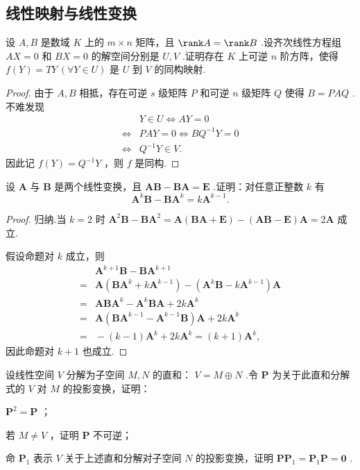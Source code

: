 \subsection{线性映射与线性变换}
\begin{prob}[2]
	设 $A,B$ 是数域 $K$ 上的 $m\times n$ 矩阵，且 $\rank A=\rank B$ .设齐次线性方程组 $AX=0$ 和 $BX=0$ 的解空间分别是 $U,V$ .证明存在 $K$ 上可逆 $n$ 阶方阵，使得 $f(Y)=TY\,(\forall Y\in U)$ 是 $U$ 到 $V$ 的同构映射.
\end{prob}
\begin{proof}
	由于 $A,B$ 相抵，存在可逆 $s$ 级矩阵 $P$ 和可逆 $n$ 级矩阵 $Q$ 使得 $B=PAQ$ .不难发现
	\begin{align*}
		     & {}Y\in U\iff AY=0      \\
		\iff & {}PAY=0\iff BQ^{-1}Y=0 \\
		\iff & {}Q^{-1}Y\in V.
	\end{align*}
	因此记 $f(Y)=Q^{-1}Y$ ，则 $f$ 是同构.
\end{proof}
\begin{prob}[14]
	设 $\bm A$ 与 $\bm B$ 是两个线性变换，且 $\bm{AB}-\bm{BA}=\bm E$ .证明：对任意正整数 $k$ 有
	\[
		\bm A^k\bm B-\bm B\bm A^k=k\bm A^{k-1}.
	\]
\end{prob}
\begin{proof}
	归纳.当 $k=2$ 时 $\bm A^2\bm B-\bm B\bm A^2=\bm A(\bm{BA}+\bm E)-(\bm{AB}-\bm E)\bm A=2\bm A$ 成立.

	假设命题对 $k$ 成立，则
	\begin{align*}
		  & {}\bm A^{k+1}\bm B-\bm B\bm A^{k+1}                              \\
		= & {}\bm A(\bm{BA}^k+k\bm A^{k-1})-(\bm A^k\bm B-k\bm A^{k-1})\bm A \\
		= & {}\bm{ABA}^k-\bm A^k\bm{BA}+2k\bm A^k                            \\
		= & {}\bm A(\bm{BA}^{k-1}-\bm A^{k-1}\bm B)\bm A+2k\bm A^k           \\
		= & {}-(k-1)\bm A^k+2k\bm A^k=(k+1)\bm A^k,
	\end{align*}
	因此命题对 $k+1$ 也成立.
\end{proof}
\begin{prob}[15]
	设线性空间 $V$ 分解为子空间 $M,N$ 的直和： $V=M\oplus N$ .令 $\bm P$ 为关于此直和分解式的 $V$ 对 $M$ 的投影变换，证明：
	\begin{mylist}
		\item  $\bm P^2=\bm P$ ；
		\item 若 $M\ne V$ ，证明 $\bm P$ 不可逆；
		\item 命 $\bm P_1$ 表示 $V$ 关于上述直和分解对子空间 $N$ 的投影变换，证明 $\bm{PP}_1=\bm P_1\bm P=\bm 0$ .
	\end{mylist}
\end{prob}
